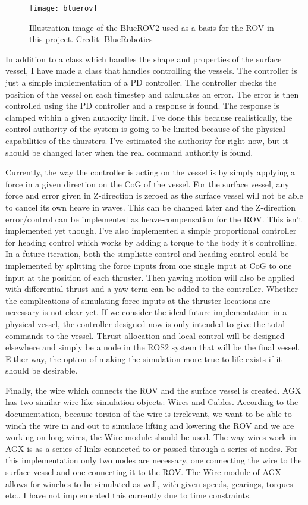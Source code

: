 \begin{figure}
	\centering
	\texttt{[image: bluerov]}
	\caption{Illustration image of the BlueROV2 used as a basis for the ROV in this project. Credit: BlueRobotics}
	\label{fig:bluerov}
\end{figure}

In addition to a class which handles the shape and properties of the surface vessel, I have made a class that handles controlling the vessels. The controller is just a simple implementation of a PD controller. The controller checks the position of the vessel on each timestep and calculates an error. The error is then controlled using the PD controller and a response is found. The response is clamped within a given authority limit. I've done this because realistically, the control authority of the system is going to be limited because of the physical capabilities of the thursters. I've estimated the authority for right now, but it should be changed later when the real command authority is found. 

Currently, the way the controller is acting on the vessel is by simply applying a force in a given direction on the CoG of the vessel. For the surface vessel, any force and error given in Z-direction is zeroed as the surface vessel will not be able to cancel its own heave in waves. This can be changed later and the Z-direction error/control can be implemented as heave-compensation for the ROV. This isn't implemented yet though. I've also implemented a simple proportional controller for heading control which works by adding a torque to the body it's controlling. In a future iteration, both the simplistic control and heading control could be implemented by splitting the force inputs from one single input at CoG to one input at the position of each thruster. Then yawing motion will also be applied with differential thrust and a yaw-term can be added to the controller. Whether the complications of simulating force inputs at the thruster locations are necessary is not clear yet. If we consider the ideal future implementation in a physical vessel, the controller designed now is only intended to give the total commands to the vessel. Thrust allocation and local control will be designed elsewhere and simply be a node in the ROS2 system that will be the final vessel. Either way, the option of making the simulation more true to life exists if it should be desirable. 

Finally, the wire which connects the ROV and the surface vessel is created. AGX has two similar wire-like simulation objects: Wires and Cables. According to the documentation, because torsion of the wire is irrelevant, we want to be able to winch the wire in and out to simulate lifting and lowering the ROV and we are working on long wires, the Wire module should be used. The way wires work in AGX is as a series of links connected to or passed through a series of nodes. For this implementation only two nodes are necessary, one connecting the wire to the surface vessel and one connecting it to the ROV. The Wire module of AGX allows for winches to be simulated as well, with given speeds, gearings, torques etc.. I have not implemented this currently due to time constraints. 

